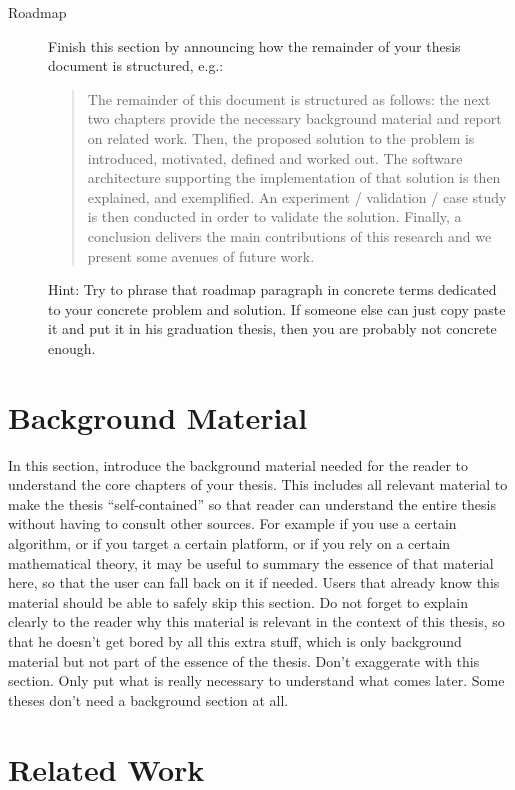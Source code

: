 \documentclass[british]{article}
\begin{document}
\begin{description}
\item[Roadmap] Finish this section by announcing how the remainder of
  your thesis document is structured, e.g.:
  \begin{quote}
    The remainder of this document is structured as follows: the next
    two chapters provide the necessary background material and report
    on related work. Then, the proposed solution to the problem is
    introduced, motivated, defined and worked out. The software
    architecture supporting the implementation of that solution is
    then explained, and exemplified. An experiment / validation / case
    study is then conducted in order to validate the
    solution. Finally, a conclusion delivers the main contributions of
    this research and we present some avenues of future work.
  \end{quote}
  Hint: Try to phrase that roadmap paragraph in concrete terms
  dedicated to your concrete problem and solution. If someone else can
  just copy paste it and put it in his graduation thesis, then you are
  probably not concrete enough.
\end{description}

\section*{Background Material}

In this section, introduce the background material needed for the
reader to understand the core chapters of your thesis. This includes
all relevant material to make the thesis “self-contained” so that
reader can understand the entire thesis without having to consult
other sources. For example if you use a certain algorithm, or if you
target a certain platform, or if you rely on a certain mathematical
theory, it may be useful to summary the essence of that material here,
so that the user can fall back on it if needed. Users that already
know this material should be able to safely skip this section. Do not
forget to explain clearly to the reader why this material is relevant
in the context of this thesis, so that he doesn’t get bored by all
this extra stuff, which is only background material but not part of
the essence of the thesis. Don’t exaggerate with this section. Only
put what is really necessary to understand what comes later. Some
theses don’t need a background section at all.

\section*{Related Work}
\end{document}
